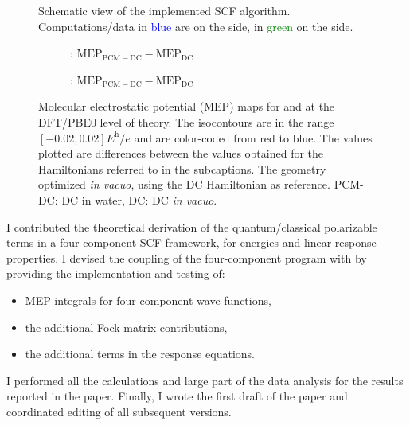 \begin{figure}[!htb]
\centering
\scalebox{0.8}{}
\caption[Modular approach to programming a \acs{PCM} functionality into an existing \acs{SCF} code.]{
  Schematic view of the implemented SCF algorithm. Computations/data in
  \textcolor{Blue}{blue} are on the \pcmsolver side, in
  \textcolor{Green}{green} on the \DIRAC side.
  }
\label{fig:algorithm}
\end{figure}

\begin{figure}
\centering
\begin{subfigure}[b]{0.5\textwidth}
\caption{: $\mathrm{MEP}_\mathrm{PCM-DC} - \mathrm{MEP}_\mathrm{DC}$}
\label{fig:H2Odiff_pcmdc-dc}
\end{subfigure}%
\begin{subfigure}[b]{0.5\textwidth}
\caption{: $\mathrm{MEP}_\mathrm{PCM-DC} - \mathrm{MEP}_\mathrm{DC}$}
\label{fig:H2Podiff_pcmdc-dc}
\end{subfigure}
\caption[Molecular electrostatic potential (\acs{MEP}) maps for  and  at
  the \acs{DFT}/PBE0 level of theory.]{
  Molecular electrostatic potential (\acs{MEP}) maps for  and  at
  the \acs{DFT}/PBE0 level of theory.
  The isocontours are in the range $[-0.02, 0.02] \si{\hartree\per\elementarycharge}$ and are
  color-coded from red to blue.
  The values plotted are differences between the values obtained for the
  Hamiltonians referred to in the subcaptions. The geometry optimized \emph{in
  vacuo}, using the \acl{DC} Hamiltonian as reference.
  \acs{PCM}-\acs{DC}: \acl{DC} in water, \acs{DC}: \acl{DC} \emph{in vacuo}.}
\label{fig:MEP_maps}
\end{figure}

I contributed the theoretical derivation of the quantum/classical polarizable
terms in a four-component \acs{SCF} framework, for energies and linear response
properties. I devised the coupling of the four-component program \DIRAC with
\pcmsolver by providing the implementation and testing of:
\begin{itemize}
  \item \acs{MEP} integrals for four-component wave functions,
  \item the additional Fock matrix contributions,
  \item the additional terms in the response equations.
\end{itemize}
I performed all the calculations and large part of the data analysis
for the results reported in the paper.
Finally, I wrote the first draft of the paper and coordinated editing of
all subsequent versions.

